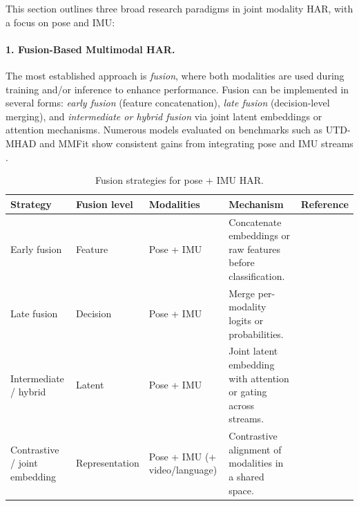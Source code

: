This section outlines three broad research paradigms in joint modality HAR, with a focus on pose and IMU:

\paragraph{1. Fusion-Based Multimodal HAR.}
The most established approach is \textit{fusion}, where both modalities are used during training and/or inference to enhance performance. Fusion can be implemented in several forms: \textit{early fusion} (feature concatenation), \textit{late fusion} (decision-level merging), and \textit{intermediate or hybrid fusion} via joint latent embeddings or attention mechanisms. Numerous models evaluated on benchmarks such as UTD-MHAD and MMFit show consistent gains from integrating pose and IMU streams \cite{stromback2020mm, chen2015utd, zhou2024cross, khattak2022cross}.

\begin{table}[t]
  \centering
  \footnotesize
  \caption{Fusion strategies for pose + IMU HAR.}
  \label{tab:fusion-strategies}
  \begin{tabular}{l l l p{5.2cm} l}
    \toprule
    \textbf{Strategy} & \textbf{Fusion level} & \textbf{Modalities} & \textbf{Mechanism} & \textbf{Reference} \\
    \midrule
    Early fusion & Feature & Pose + IMU & Concatenate embeddings or raw features before classification. & \cite{chen2015utd} \\
    Late fusion & Decision & Pose + IMU & Merge per-modality logits or probabilities. & \cite{stromback2020mm} \\
    Intermediate / hybrid & Latent & Pose + IMU & Joint latent embedding with attention or gating across streams. & \cite{khattak2022cross, zhou2024cross} \\
    Contrastive / joint embedding & Representation & Pose + IMU (+ video/language) & Contrastive alignment of modalities in a shared space. & \cite{fritsch2025mujo, dixon2024modality} \\
    \bottomrule
  \end{tabular}
\end{table}

